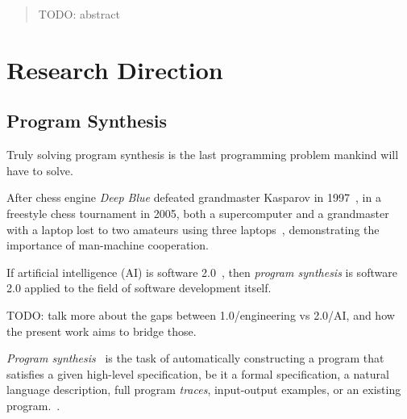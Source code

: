 \documentclass{article}
\begin{document}


\tableofcontents

\pagebreak

\begin{abstract}
    TODO: abstract
\end{abstract}

\section{Research Direction} %

\subsection{Program Synthesis}

\epigraph{
    Truly solving program synthesis is the last programming problem mankind will have to solve.
}{
    \textit{\citet{nps}}
}

After chess engine \emph{Deep Blue} defeated grandmaster Kasparov in 1997~\citep{deepblue},
in a freestyle chess tournament in 2005,
both a supercomputer and a grandmaster with a laptop lost to two amateurs using three laptops~\citep{kasparov},
demonstrating the importance of man-machine cooperation.

\begin{displayquote}
    If artificial intelligence (AI) is software 2.0~\citep{software20},
    then \emph{program synthesis} is software 2.0 applied to the field of software development itself.
\end{displayquote}

TODO: talk more about the gaps between 1.0/engineering vs 2.0/AI, and how the present work aims to bridge those.

\emph{Program synthesis}~\citep{church1957applications} is the task of automatically constructing a program%
that satisfies a given high-level specification,
be it a formal specification, a natural language description,
full program \emph{traces}, input-output examples,
or an existing program.~\citep{gulwani2017program}.
\end{document}
